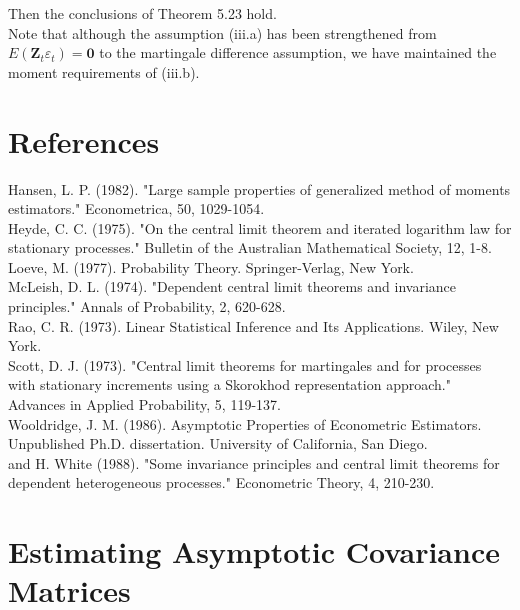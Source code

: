 \documentclass[10pt]{article}
\begin{document}
Then the conclusions of Theorem 5.23 hold.\\
Note that although the assumption (iii.a) has been strengthened from $E\left(\mathbf{Z}_{t} \varepsilon_{t}\right)=\mathbf{0}$ to the martingale difference assumption, we have maintained the moment requirements of (iii.b).

\section*{References}
Hansen, L. P. (1982). "Large sample properties of generalized method of moments estimators." Econometrica, 50, 1029-1054.\\
Heyde, C. C. (1975). "On the central limit theorem and iterated logarithm law for stationary processes." Bulletin of the Australian Mathematical Society, 12, 1-8.\\
Loeve, M. (1977). Probability Theory. Springer-Verlag, New York.\\
McLeish, D. L. (1974). "Dependent central limit theorems and invariance principles." Annals of Probability, 2, 620-628.\\
Rao, C. R. (1973). Linear Statistical Inference and Its Applications. Wiley, New York.\\
Scott, D. J. (1973). "Central limit theorems for martingales and for processes with stationary increments using a Skorokhod representation approach." Advances in Applied Probability, 5, 119-137.\\
Wooldridge, J. M. (1986). Asymptotic Properties of Econometric Estimators. Unpublished Ph.D. dissertation. University of California, San Diego.\\
and H. White (1988). "Some invariance principles and central limit theorems for dependent heterogeneous processes." Econometric Theory, 4, 210-230.

\section*{Estimating Asymptotic Covariance Matrices}
\end{document}
